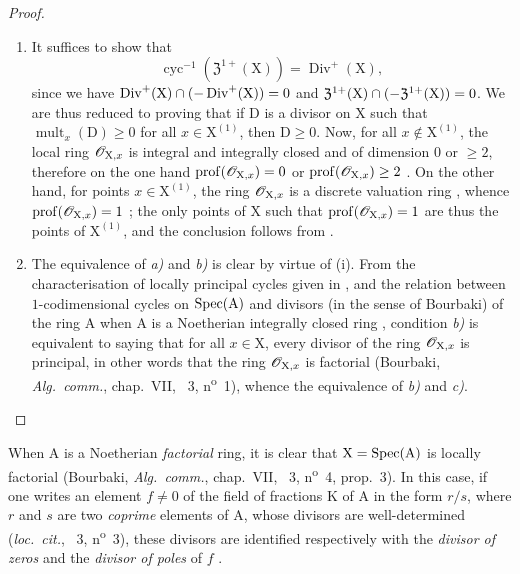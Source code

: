 \begin{proof}
\begin{enumerate}[label=(\roman*)]
  \item It suffices to show that
\[
\label{IV.21.6.9.1}
  \operatorname{cyc}^{-1}(\mathfrak{Z}^{1+}(\mathrm{X}))=\operatorname{Div}^+(\mathrm{X}),
  \tag{21.6.9.1}
\]
since we have $\operatorname{Div}^+(\mathrm{X})\cap(-\operatorname{Div}^+(\mathrm{X}))=0$ and $\mathfrak{Z}^{1+}(\mathrm{X})\cap(-\mathfrak{Z}^{1+}(\mathrm{X}))=0$.
We are thus reduced to proving that if $\mathrm{D}$ is a divisor on $\mathrm{X}$ such that $\operatorname{mult}_x(\mathrm{D})\geq 0$ for all $x\in\mathrm{X}^{(1)}$, then $\mathrm{D}\geq 0$.
Now, for all $x\notin\mathrm{X}^{(1)}$, the local ring $\mathscr{O}_{\mathrm{X},x}$ is integral and integrally closed and
of dimension $0$ or $\geq 2$, therefore on the one hand $\operatorname{prof}(\mathscr{O}_{\mathrm{X},x})=0$ or $\operatorname{prof}(\mathscr{O}_{\mathrm{X},x})\geq 2$ .
On the other hand, for points $x\in\mathrm{X}^{(1)}$, the ring $\mathscr{O}_{\mathrm{X},x}$ is a discrete valuation ring ,
whence $\operatorname{prof}(\mathscr{O}_{\mathrm{X},x})=1$ ;
the only points of $\mathrm{X}$ such that $\operatorname{prof}(\mathscr{O}_{\mathrm{X},x})=1$ are thus the points of $\mathrm{X}^{(1)}$, and the conclusion follows from .

  \item The equivalence of \emph{a)} and \emph{b)} is clear by virtue of (i).
From the characterisation of locally principal cycles given in , and the relation between $1$-codimensional cycles on $\operatorname{Spec}(\mathrm{A})$ and divisors (in the sense of Bourbaki) of the ring $\mathrm{A}$ when $\mathrm{A}$ is a Noetherian integrally closed ring , condition \emph{b)} is equivalent to saying that for all $x\in\mathrm{X}$, every divisor of the ring $\mathscr{O}_{\mathrm{X},x}$ is principal, in other words that the ring $\mathscr{O}_{\mathrm{X},x}$ is factorial (Bourbaki, \emph{Alg.\ comm.}, chap.~VII, \textsection~3, n\textsuperscript{o}~1), whence the equivalence of \emph{b)} and \emph{c)}.
\end{enumerate}
\end{proof}

\begin{env}[21.6.9.2]
\label{IV.21.6.9.2}
When $\mathrm{A}$ is a Noetherian \emph{factorial} ring, it is clear that $\mathrm{X}=\operatorname{Spec}(\mathrm{A})$ is locally factorial (Bourbaki, \emph{Alg.\ comm.}, chap.~VII, \textsection~3, n\textsuperscript{o}~4, prop.~3).
In this case, if one writes an element $f\neq 0$ of the field of fractions $\mathrm{K}$ of $\mathrm{A}$ in the form $r/s$, where $r$ and $s$ are two \emph{coprime} elements of $\mathrm{A}$, whose divisors are well-determined (\emph{loc.\ cit.}, \textsection~3, n\textsuperscript{o}~3), these divisors are identified respectively with the \emph{divisor of zeros} and the \emph{divisor of poles} of $f$ .
\end{env}

